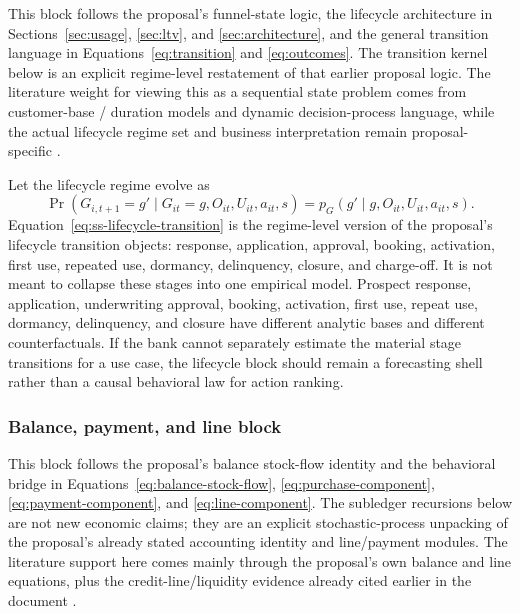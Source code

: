 \documentclass[11pt]{article}
\newcommand{\1}{\mathbf{1}}
\begin{document}
This block follows the proposal's funnel-state logic, the lifecycle
architecture in Sections~\ref{sec:usage}, \ref{sec:ltv}, and
\ref{sec:architecture}, and the general transition language in
Equations~\eqref{eq:transition} and \eqref{eq:outcomes}. The transition kernel
below is an explicit regime-level restatement of that earlier proposal logic.
The literature weight for viewing this as a sequential state problem comes from
customer-base / duration models and dynamic decision-process language, while the
actual lifecycle regime set and business interpretation remain proposal-specific
\citep{schmittlein1987counting,fader2005bgnbd,bolton1998duration,
puterman1994mdp,murphy2003dynamic}.

Let the lifecycle regime evolve as
\begin{equation}
  \Pr(G_{i,t+1}=g'\mid G_{it}=g,O_{it},U_{it},a_{it},s)
  = p_G(g'\mid g,O_{it},U_{it},a_{it},s).
  \label{eq:ss-lifecycle-transition}
\end{equation}
Equation~\eqref{eq:ss-lifecycle-transition} is the regime-level version of the
proposal's lifecycle transition objects: response, application, approval,
booking, activation, first use, repeated use, dormancy, delinquency, closure,
and charge-off.
It is not meant to collapse these stages into one empirical model. Prospect
response, application, underwriting approval, booking, activation, first use,
repeat use, dormancy, delinquency, and closure have different analytic bases and
different counterfactuals. If the bank cannot separately estimate the material
stage transitions for a use case, the lifecycle block should remain a
forecasting shell rather than a causal behavioral law for action ranking.

\subsubsection{Balance, payment, and line block}
\label{subsec:state-space-balance-block}

This block follows the proposal's balance stock-flow identity and the
behavioral bridge in Equations~\eqref{eq:balance-stock-flow},
\eqref{eq:purchase-component}, \eqref{eq:payment-component}, and
\eqref{eq:line-component}. The subledger recursions below are not new economic
claims; they are an explicit stochastic-process unpacking of the proposal's
already stated accounting identity and line/payment modules. The literature
support here comes mainly through the proposal's own balance and line equations,
plus the credit-line/liquidity evidence already cited earlier in the document
\citep{gross2001liquidity}.
\end{document}

